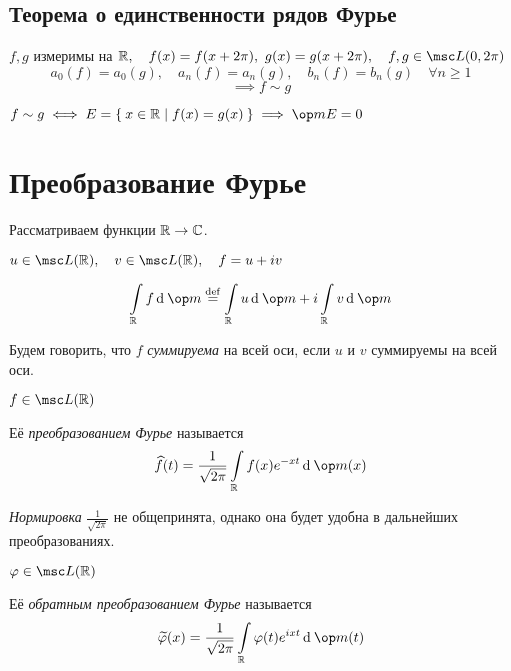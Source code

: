 \subsection{Теорема о единственности рядов Фурье}

\begin{theorem}
	$ f, g $ измеримы на $ \R, \quad f(x) = f(x + 2\pi), ~ g(x) = g(x + 2\pi), \quad f, g \in \msc L(0, 2\pi) $
	$$ a_0(f) = a_0(g), \quad a_n(f) = a_n(g), \quad b_n(f) = b_n(g) \quad \forall n \ge 1 $$
	$$ \implies f \sim g $$
\end{theorem}

\begin{remind}
	$ f \sim g \iff E = \set{x \in \R \mid f(x) = g(x)} \implies \op m E = 0 $
\end{remind}

\section{Преобразование Фурье}

Рассматриваем функции $ \mathbb{R} \to \mathbb{C} $.

\begin{definition}
	$ u \in \msc L(\R), \quad v \in \msc L(\R), \quad f = u + iv $
	\begin{remind}
		$$ \int\limits_\R f \di \op m \bydef \int\limits_\R u \di \op m + i \int\limits_\R v \di \op m $$
	\end{remind}

	Будем говорить, что $ f $ \emph{суммируема} на всей оси, если $ u $ и $ v $ суммируемы на всей оси.
\end{definition}

\begin{definition}
	$ f \in \msc L(\R) $

	Её \emph{преобразованием Фурье} называется
	$$ \hat f(t) = \frac1{\sqrt{2\pi}} \int\limits_\R f(x) e^{-xt} \di \op m (x) $$
\end{definition}

\begin{note}
	\emph{Нормировка} $ \frac1{\sqrt{2\pi}} $ не общепринята, однако она будет удобна в дальнейших преобразованиях.
\end{note}

\begin{definition}
	$ \phi \in \msc L(\R) $

	Её \emph{обратным преобразованием Фурье} называется
	$$ \vawe \phi(x) = \frac1{\sqrt{2\pi}} \int\limits_\R \phi(t) e^{ixt} \di \op m(t) $$
\end{definition}


